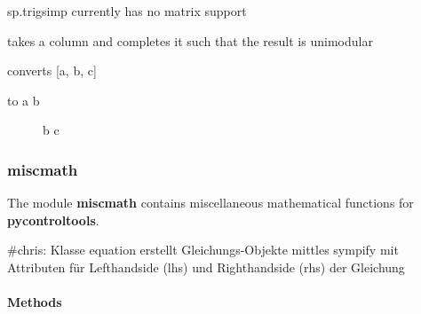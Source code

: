 \documentclass[letterpaper,10pt,english]{sphinxmanual}
\begin{document}

\begin{fulllineitems}
\label{pycontroltools:auxfuncs.math.matrix.trigsimp}
sp.trigsimp currently has no matrix support

\end{fulllineitems}


\begin{fulllineitems}
\label{pycontroltools:auxfuncs.math.matrix.unimod_completion}
takes a column and completes it such that the result is unimodular

\end{fulllineitems}


\begin{fulllineitems}
\label{pycontroltools:auxfuncs.math.matrix.vect_to_symm_matrix}
converts
{[}a, b, c{]}
\begin{description}
\item[{to    a b}] \leavevmode
b c

\end{description}

\end{fulllineitems}



\subsubsection{\textbf{miscmath}}
\label{pycontroltools:miscmath}
The module \textbf{miscmath} contains miscellaneous mathematical functions for
\textbf{pycontroltools}.
\label{pycontroltools:module-auxfuncs.math.miscmath}\label{pycontroltools:module-miscmath}

\begin{fulllineitems}
\label{pycontroltools:auxfuncs.math.miscmath.equation}
\#chris:  Klasse equation erstellt Gleichungs-Objekte mittles sympify
mit Attributen für Lefthandside (lhs) und Righthandside (rhs)
der Gleichung
\paragraph{Methods}

\end{fulllineitems}
\end{document}
